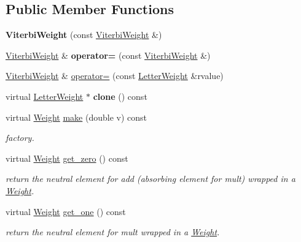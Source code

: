 \subsection*{Public Member Functions}
\begin{DoxyCompactItemize}
\item 
{\bfseries Viterbi\+Weight} (const \mbox{\hyperlink{classViterbiWeight}{Viterbi\+Weight}} \&)
\item 
\mbox{\hyperlink{classViterbiWeight}{Viterbi\+Weight}} \& {\bfseries operator=} (const \mbox{\hyperlink{classViterbiWeight}{Viterbi\+Weight}} \&)
\item 
\mbox{\hyperlink{classViterbiWeight}{Viterbi\+Weight}} \& \mbox{\hyperlink{group__weight_ga6624ad5a46c38eeae5382fc00cf4b8a0}{operator=}} (const \mbox{\hyperlink{classLetterWeight}{Letter\+Weight}} \&rvalue)
\item 
virtual \mbox{\hyperlink{classLetterWeight}{Letter\+Weight}} $\ast$ {\bfseries clone} () const
\item 
virtual \mbox{\hyperlink{classWeight}{Weight}} \mbox{\hyperlink{classViterbiWeight_a8b4676e41a4edb2cc5466d1e8cb1059a}{make}} (double v) const
\begin{DoxyCompactList}\small\item\em factory. \end{DoxyCompactList}\item 
\mbox{\label{classViterbiWeight_af7655a0c00c0af95699e186ceec25a7e}} 
virtual \mbox{\hyperlink{classWeight}{Weight}} \mbox{\hyperlink{classViterbiWeight_af7655a0c00c0af95699e186ceec25a7e}{get\+\_\+zero}} () const
\begin{DoxyCompactList}\small\item\em return the neutral element for add (absorbing element for mult) wrapped in a \mbox{\hyperlink{classWeight}{Weight}}. \end{DoxyCompactList}\item 
\mbox{\label{classViterbiWeight_a5009d22fc226821a8dfd876ed9bd9e84}} 
virtual \mbox{\hyperlink{classWeight}{Weight}} \mbox{\hyperlink{classViterbiWeight_a5009d22fc226821a8dfd876ed9bd9e84}{get\+\_\+one}} () const
\begin{DoxyCompactList}\small\item\em return the neutral element for mult wrapped in a \mbox{\hyperlink{classWeight}{Weight}}. \end{DoxyCompactList}\item 

\end{DoxyCompactItemize}
